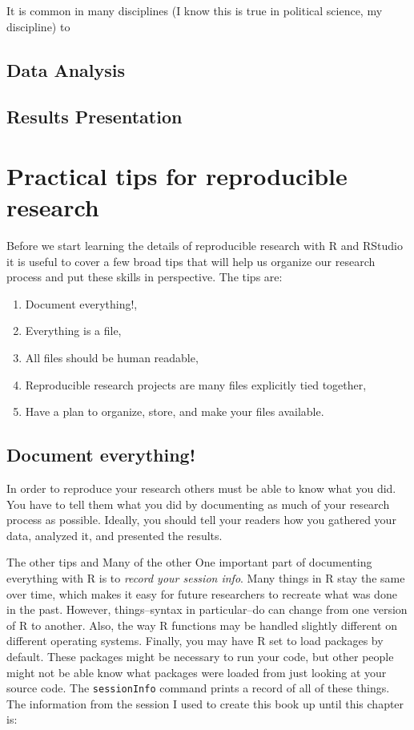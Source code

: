 \documentclass[ChapterTOCs,krantz1]{krantz}\usepackage{graphicx, color}
\begin{document}
It is common in many disciplines (I know this is true in political science, my discipline) to 

\subsection{Data Analysis}

\subsection{Results Presentation}

\section{Practical tips for reproducible research}

Before we start learning the details of reproducible research with R and RStudio it is useful to cover a few broad tips that will help us organize our research process and put these skills in perspective. The tips are:

\begin{enumerate}
    \item Document everything!,
    \item Everything is a file,
    \item All files should be human readable,
    \item Reproducible research projects are many files explicitly tied together,
    \item Have a plan to organize, store, and make your files available.
    
\end{enumerate}

\subsection{Document everything!}

In order to reproduce your research others must be able to know what you did. You have to tell them what you did by documenting as much of your research process as possible. Ideally, you should tell your readers how you gathered your data, analyzed it, and presented the results.

The other tips and Many of the other One important part of documenting everything with R is to \emph{record your session info}. Many things in R stay the same over time, which makes it easy for future researchers to recreate what was done in the past. However, things--syntax in particular--do can change from one version of R to another. Also, the way R functions may be handled slightly different on different operating systems. Finally, you may have R set to load packages by default. These packages might be necessary to run your code, but other people might not be able know what packages were loaded from just looking at your source code. The \texttt{sessionInfo} command prints a record of all of these things. The information from the session I used to create this book up until this chapter is:
\end{document}
